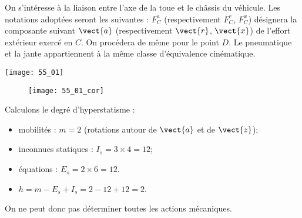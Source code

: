 \normalfalse \difficiletrue \tdifficilefalse
\correctiontrue


\setcounter{question}{0}%
\ifcorrection
\else
{}
\fi

\ifprof
\else
On s'intéresse à la liaison entre l'axe de la toue et le châssis du véhicule. Les notations adoptées seront les suivantes : $F^a_{C}$ (respectivement $F^r_{C}$, $F^x_{C}$) désignera la composante suivant $\vect{a}$ (respectivement $\vect{r}$, $\vect{x}$) de l'effort extérieur exercé en $C$. On procédera de même pour le point $D$. Le pneumatique et la jante appartiennent à la même classe d'équivalence cinématique.  
\begin{marginfigure}
\texttt{[image: 55\_01]}
\end{marginfigure}


\fi

\ifprof
\begin{figure}[!h]
\texttt{[image: 55\_01\_cor]}
\end{figure}

\else
\fi



\ifprof
Calculons le degré d'hyperstatisme : 
\begin{itemize}
\item mobilités : $m=2$ (rotations autour de $\vect{a}$ et de $\vect{z}$);
\item inconnues statiques : $I_s = 3 \times 4 = 12$;
\item équations : $E_s = 2\times 6=12$. 
\item $h = m-E_s + I_s= 2 -12 + 12 = 2$.
\end{itemize}
On ne peut donc pas déterminer toutes les actions mécaniques. 

\else
\fi
\ifprof
\else


\fi
